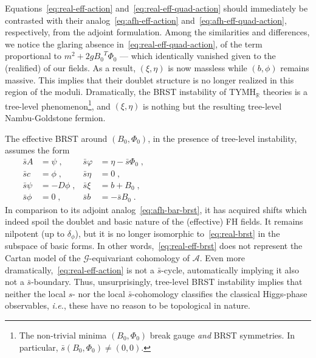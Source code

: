 \documentclass[../main.tex]{subfiles}
\begin{document}
Equations~\eqref{eq:real-eff-action} and~\eqref{eq:real-eff-quad-action} should immediately be contrasted with their analog~\eqref{eq:afh-eff-action} and~\eqref{eq:afh-eff-quad-action}, respectively, from the adjoint formulation. Among the similarities and differences, we notice the glaring absence in~\eqref{eq:real-eff-quad-action}, of the term proportional to $m^2 + 2g {B_0}^{T} \Phi_0$ --- which identically vanished given to the (realified)  of our fields. As a result, $(\xi, \eta)$ is now massless while $(b,\phi)$ remains massive. This implies that their doublet structure is no longer realized in this region of the moduli. Dramatically, the BRST instability of TYMH$_{\mathbb{R}}$ theories is a tree-level phenomenon\footnote{The non-trivial minima $(B_0,\Phi_0)$ break gauge \textit{and} BRST symmetries. In particular, $\bar{s}(B_0, \Phi_0) \neq (0,0)$.}, and $(\xi, \eta)$ is nothing but the resulting tree-level Nambu-Goldstone fermion.

The effective BRST around $(B_0, \Phi_0)$, in the presence of tree-level instability, assumes the form
\begin{subequations}%
  \label{eq:real-eff-brst}
  \begin{align}
    \bar{s} A    & = \psi \;,    & \bar{s} \varphi & = \eta - \bar{s} \Phi_0\;, & \hspace{200pt} \\
    \bar{s} c    & = \phi  \;,   & \bar{s} \eta    & = 0 \;,                    & \hspace{200pt} \\
    \bar{s} \psi & = -D \phi \;, & \bar{s} \xi     & = b + B_0 \;,              & \hspace{200pt} \\
    \bar{s} \phi & = 0  \;,      & \bar{s} b       & = - \bar{s} B_0  \;.       & \hspace{200pt}
  \end{align}
\end{subequations}
In comparison to its adjoint analog~\eqref{eq:afh-bar-brst}, it has acquired shifts which indeed spoil the doublet and basic nature of the (effective) FH fields. It remains nilpotent (up to $\delta_{\phi}$), but it is no longer isomorphic to~\eqref{eq:real-brst} in the subspace of basic forms. In other words,~\eqref{eq:real-eff-brst} does not represent the Cartan model of the $\mathcal{G}$-equivariant cohomology of $\mathcal{A}$. Even more dramatically,~\eqref{eq:real-eff-action} is not a $\bar{s}$-cycle, automatically implying it also not a $\bar{s}$-boundary. Thus, unsurprisingly, tree-level BRST instability implies that neither the local $s$- nor the local $\bar{s}$-cohomology classifies the classical Higgs-phase observables, \textit{i.e.}, these have no reason to be topological in nature.
\end{document}
